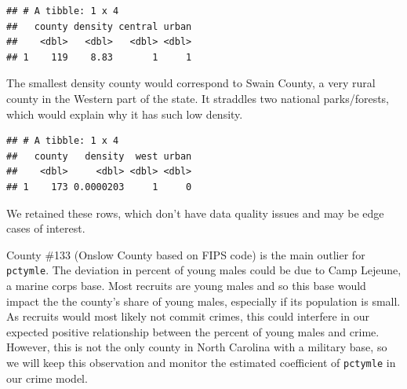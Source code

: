 \documentclass[]{article}
\newenvironment{Shaded}{\begin{snugshade}}{\end{snugshade}}
\newcommand{\KeywordTok}[1]{\textcolor[rgb]{0.13,0.29,0.53}{\textbf{#1}}}
\newcommand{\NormalTok}[1]{#1}
\newcommand{\OperatorTok}[1]{\textcolor[rgb]{0.81,0.36,0.00}{\textbf{#1}}}
\newcommand{\StringTok}[1]{\textcolor[rgb]{0.31,0.60,0.02}{#1}}
\begin{document}
\begin{Shaded}
\end{Shaded}

\begin{verbatim}
## # A tibble: 1 x 4
##   county density central urban
##    <dbl>   <dbl>   <dbl> <dbl>
## 1    119    8.83       1     1
\end{verbatim}

The smallest density county would correspond to Swain County, a very
rural county in the Western part of the state. It straddles two national
parks/forests, which would explain why it has such low density.

\begin{Shaded}
\end{Shaded}

\begin{verbatim}
## # A tibble: 1 x 4
##   county   density  west urban
##    <dbl>     <dbl> <dbl> <dbl>
## 1    173 0.0000203     1     0
\end{verbatim}

We retained these rows, which don't have data quality issues and may be
edge cases of interest.

County \#133 (Onslow County based on FIPS code) is the main outlier for
\texttt{pctymle}. The deviation in percent of young males could be due
to Camp Lejeune, a marine corps base. Most recruits are young males and
so this base would impact the the county's share of young males,
especially if its population is small. As recruits would most likely not
commit crimes, this could interfere in our expected positive
relationship between the percent of young males and crime. However, this
is not the only county in North Carolina with a military base, so we
will keep this observation and monitor the estimated coefficient of
\texttt{pctymle} in our crime model.
\end{document}
